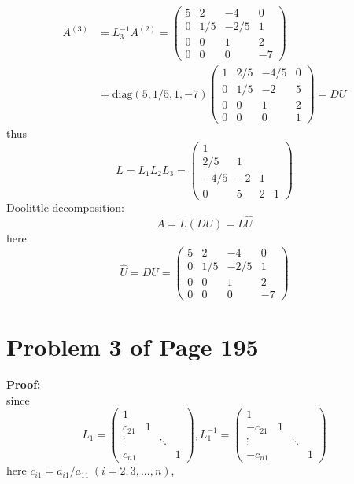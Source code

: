 \documentclass[12pt,a4paper]{article}
\newcommand{\mysection}[2]{
\section{Problem #1 of Page #2}	
	}
\begin{document}
\[ \begin{split} 
	A^{(3)} &= L_3^{-1}A^{(2)} =  \left( \begin{array}{cccc}
	5 & 2 & -4 & 0\\
	0 & 1/5 & -2/5 & 1 \\
	0 & 0 & 1 & 2 \\
	0 & 0 & 0 & -7 
	\end{array} \right) \\
	&= \text{diag}(5,1/5,1,-7) \left( \begin{array}{cccc}
	1 & 2/5 & -4/5 & 0\\
	0 & 1/5 & -2 & 5 \\
	0 & 0 & 1 & 2 \\
	0 & 0 & 0 & 1 
	\end{array} \right) = DU
	\end{split} 
\]
thus 
\[
	L = L_1L_2L_3 =  \left( \begin{array}{cccc}
	1 &   &   & \\
	2/5 & 1 &  & \\
	-4/5 & -2 & 1 &  \\
	0 & 5 & 2 & 1 
	\end{array} \right)
\]
Doolittle decomposition:
\[
	A = L(DU) = L\hat{U}
\]
here 
\[
	\hat{U} = DU = \left( \begin{array}{cccc}
	       5        &     2      &      -4     &        0  \\    
	       0       &     1/5     &     -2/5    &        1  \\    
	       0       &      0      &       1     &        2  \\    
	       0       &      0      &      0      &      -7  
	    \end{array}\right)
\]
\mysection{3}{195}
\textbf{Proof:} \\
since
\[
	L_1 = \left(\begin{array}{cccc} 
	 1 & & & \\
	 c_{21} & 1& & \\
	 \vdots & & \ddots & \\
	 c_{n1} & & &1
	\end{array} \right) ,
	L_1^{-1} = \left(\begin{array}{cccc} 
		1 & & & \\
		-c_{21} & 1& & \\
		\vdots & & \ddots & \\
		-c_{n1} & & &1
		\end{array} \right) 
\]
here $c_{i1} = a_{i1}/a_{11} \ ( i=2,3,...,n)$,
\end{document}
